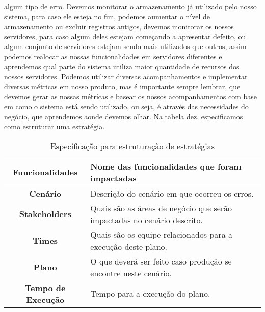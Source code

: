       algum tipo de erro. Devemos monitorar o armazenamento já utilizado pelo nosso
      sistema, para caso ele esteja no fim, podemos aumentar o nível de armazenamento
      ou excluir registros antigos, devemos monitorar os nossos servidores, para
      caso algum deles estejam começando a apresentar defeito, ou algum conjunto
      de servidores estejam sendo mais utilizados que outros, assim podemos realocar
      as nossas funcionalidades em servidores diferentes e aprendemos qual parte
      do sistema utiliza maior quantidade de recursos dos nossos servidores. Podemos
      utilizar diversas acompanhamentos e implementar diversas métricas em nosso
      produto, mas é importante sempre lembrar, que devemos gerar as nossas métricas
      e basear os nossos acompanhamentos com base em como o sistema está sendo
      utilizado, ou seja, é através das necessidades do negócio, que aprendemos
      aonde devemos olhar. Na tabela dez, especificamos como estruturar uma
      estratégia.\newline

      \begin{table}[h!]
        \centering
        \begin{tabular}{|c|p{10cm}|}
          \hline
          \textbf{Funcionalidades} &
          Nome das funcionalidades que foram impactadas \\ \hline
          \textbf{Cenário} &
          Descrição do cenário em que ocorreu os erros. \\ \hline
          \textbf{Stakeholders} &
          Quais são as áreas de negócio que serão impactadas no cenário descrito. \\ \hline
          \textbf{Times} &
          Quais são os equipe relacionados para a execução deste plano. \\ \hline
          \textbf{Plano} &
          O que deverá ser feito caso produção se encontre neste cenário. \\ \hline
          \textbf{Tempo de Execução} &
          Tempo para a execução do plano. \\ \hline
        \end{tabular}
        \caption{Especificação para estruturação de estratégias}
        \label{Tabela:11}
      \end{table}

